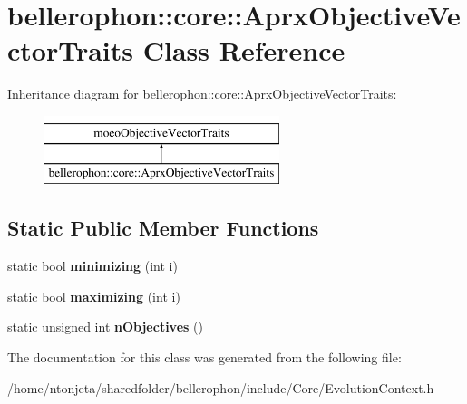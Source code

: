 \hypertarget{classbellerophon_1_1core_1_1AprxObjectiveVectorTraits}{}\section{bellerophon\+:\+:core\+:\+:Aprx\+Objective\+Vector\+Traits Class Reference}
\label{classbellerophon_1_1core_1_1AprxObjectiveVectorTraits}
Inheritance diagram for bellerophon\+:\+:core\+:\+:Aprx\+Objective\+Vector\+Traits\+:\begin{figure}[H]
\begin{center}
\leavevmode
\includegraphics[height=2.000000cm]{classbellerophon_1_1core_1_1AprxObjectiveVectorTraits}
\end{center}
\end{figure}
\subsection*{Static Public Member Functions}
\begin{DoxyCompactItemize}
\item 
\hypertarget{classbellerophon_1_1core_1_1AprxObjectiveVectorTraits_a283aeb0cc76b497eae39234a595e4d8a}{}\label{classbellerophon_1_1core_1_1AprxObjectiveVectorTraits_a283aeb0cc76b497eae39234a595e4d8a} 
static bool {\bfseries minimizing} (int i)
\item 
\hypertarget{classbellerophon_1_1core_1_1AprxObjectiveVectorTraits_a6903dbc402df894a17277e6feb59bbcd}{}\label{classbellerophon_1_1core_1_1AprxObjectiveVectorTraits_a6903dbc402df894a17277e6feb59bbcd} 
static bool {\bfseries maximizing} (int i)
\item 
\hypertarget{classbellerophon_1_1core_1_1AprxObjectiveVectorTraits_a655781370e097ed2e9bab03f542a3b91}{}\label{classbellerophon_1_1core_1_1AprxObjectiveVectorTraits_a655781370e097ed2e9bab03f542a3b91} 
static unsigned int {\bfseries n\+Objectives} ()
\end{DoxyCompactItemize}


The documentation for this class was generated from the following file\+:\begin{DoxyCompactItemize}
\item 
/home/ntonjeta/sharedfolder/bellerophon/include/\+Core/Evolution\+Context.\+h\end{DoxyCompactItemize}
